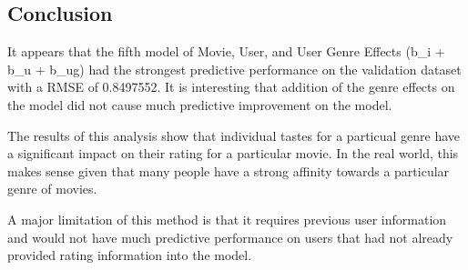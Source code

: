 \documentclass[]{article}
\begin{document}
\subsection{Conclusion}\label{conclusion}

It appears that the fifth model of Movie, User, and User Genre Effects
(b\_i + b\_u + b\_ug) had the strongest predictive performance on the
validation dataset with a RMSE of 0.8497552. It is interesting that
addition of the genre effects on the model did not cause much predictive
improvement on the model.

The results of this analysis show that individual tastes for a particual
genre have a significant impact on their rating for a particular movie.
In the real world, this makes sense given that many people have a strong
affinity towards a particular genre of movies.

A major limitation of this method is that it requires previous user
information and would not have much predictive performance on users that
had not already provided rating information into the model.
\end{document}
